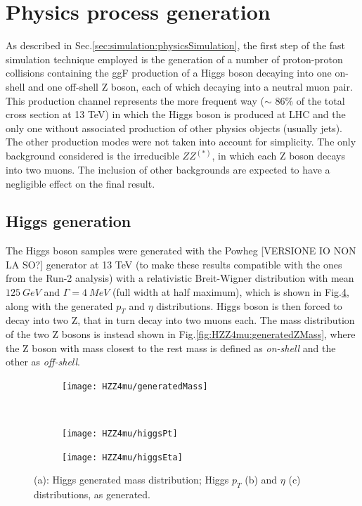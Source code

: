 \documentclass[a4paper,twoside,12pt]{book}
\begin{document}
\section{Physics process generation}
As described in Sec.\ref{sec:simulation:physicsSimulation}, the first step of the fast simulation 
technique employed is the generation of a number of proton-proton collisions containing the
ggF production of a Higgs boson decaying into one on-shell and one off-shell Z boson, 
each of which decaying into a neutral muon pair. This production channel represents the more
frequent way ($\sim$ 86\% of the total cross section at 13 TeV) in which the Higgs boson is produced at LHC and the only one without 
associated production of other physics objects (usually jets). The other production modes were not taken
into account for simplicity. The only background considered is the irreducible $ZZ^{(*)}$, 
in which each Z boson decays into two muons. The inclusion of other backgrounds are expected to 
have a negligible effect on the final result\cite{scoping}.

\subsection{Higgs generation}

The Higgs boson samples were generated with the Powheg\cite{Powheg} [VERSIONE IO NON LA SO?] generator at 13 TeV (to make these results compatible with the ones from the
Run-2 analysis) with a 
relativistic Breit-Wigner distribution with mean $125\ GeV$ and $\Gamma = 4\ MeV$ (full
width at half maximum), which 
is shown in Fig.\ref{fig:HZZ4mu:generatedHiggs}, along with the generated $p_T$ and $\eta$ distributions. Higgs boson
is then forced to decay into two Z, that in turn decay into two muons each. The mass distribution of the two Z bosons is instead shown in Fig.\ref{fig:HZZ4mu:generatedZMass}, where the Z boson with mass closest to the rest mass
is defined as \textit{on-shell} and the other as \textit{off-shell}.


\begin{figure}
\begin{subfigure}{.5\linewidth}
\texttt{[image: HZZ4mu/generatedMass]}
\caption{}
\label{fig:HZZ4mu:generatedHiggs}
\end{subfigure}\\[1ex]
\begin{subfigure}{.5\linewidth}
\centering
\texttt{[image: HZZ4mu/higgsPt]}
\caption{}
\label{fig:HZZ4mu:higgsPt}
\end{subfigure}
\begin{subfigure}{.5\linewidth}
\centering
\texttt{[image: HZZ4mu/higgsEta]}
\caption{}
\label{fig:HZZ4mu:higgsEta}
\end{subfigure}
\caption{(a): Higgs generated mass distribution;	Higgs $p_{T}$ (b) and $\eta$ (c) distributions, as generated.}
\label{fig:HZZ4mu:generatedHiggs}
\end{figure}
\end{document}
